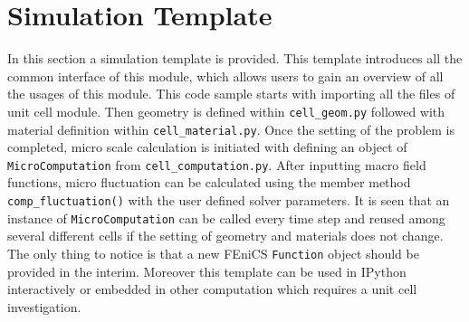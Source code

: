 \section{Simulation Template}
In this section a simulation template is provided. This template introduces all the common interface of this module, which allows users to gain an overview of all the usages of this module. This code sample starts with importing all the files of unit cell module. Then geometry is defined within \texttt{cell\_geom.py} followed with material definition within \texttt{cell\_material.py}. Once the setting of the problem is completed, micro scale calculation is initiated with defining an object of \texttt{MicroComputation} from \texttt{cell\_computation.py}. After inputting macro field functions, micro fluctuation can be calculated using the member method \texttt{comp\_fluctuation()} with the user defined solver parameters. It is seen that an instance of \texttt{MicroComputation} can be called every time step and reused among several different cells if the setting of geometry and materials does not change. The only thing to notice is that a new FEniCS \texttt{Function} object should be provided in the interim. Moreover this template can be used in IPython interactively or embedded in other computation which requires a unit cell investigation.

